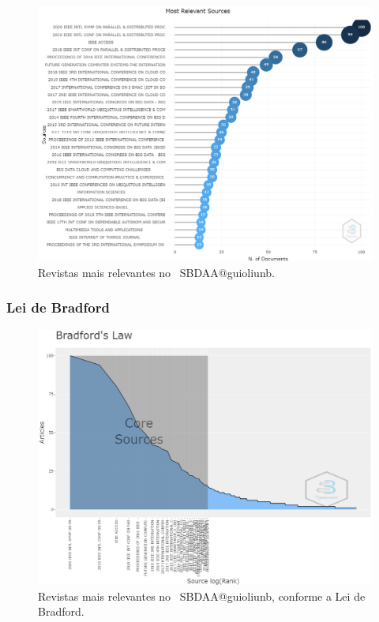 \begin{figure}
    \centering
    \includegraphics[width=1\textwidth]{experiments/guioliunb/AnaliseBibliometrica/SocialBigDataAnalysis/most relevant sources.png }
    \caption{Revistas mais relevantes no  \dataset\ SBDAA@guioliunb.}
    \label{fig:MASSA2-Most-Relevant-Sources}
\end{figure}



\subsubsection{Lei de Bradford}

\begin{figure}
    \centering
    \includegraphics[width=1\textwidth]{experiments/guioliunb/AnaliseBibliometrica/SocialBigDataAnalysis/BRADFORDS LAW.png}
    \caption{Revistas mais relevantes no  \dataset\ SBDAA@guioliunb, conforme a Lei de Bradford.}
    \label{fig:MASSA2-Bradfords-Law.png}
\end{figure}


